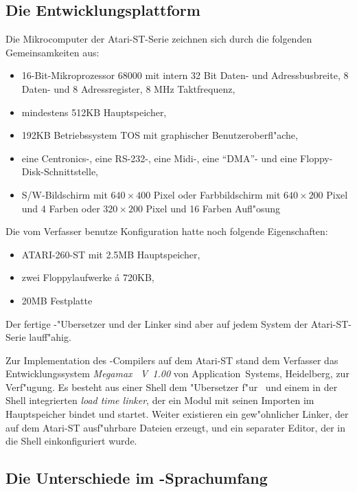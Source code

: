 \subsection{Die Entwicklungsplattform}

Die Mikrocomputer der Atari-ST-Serie zeichnen sich durch die folgenden
Gemeinsamkeiten aus:
\begin{itemize}
\item 16-Bit-Mikroprozessor 68000 mit intern 32 Bit Daten- und Adressbusbreite,
   8 Daten- und 8 Adressregister, 8 MHz Taktfrequenz,
\item mindestens 512KB Hauptspeicher,
\item 192KB Betriebssystem TOS mit graphischer Benutzeroberfl"ache,
\item eine Centronics-, eine RS-232-, eine Midi-, eine "`DMA"'- und
   eine Floppy-Disk-Schnittstelle,
\item S/W-Bildschirm mit $640\times400$ Pixel oder Farbbildschirm
   mit $640\times200$ Pixel und 4 Farben oder $320\times200$ Pixel
   und 16 Farben Aufl"osung
\end{itemize}

Die vom Verfasser benutze Konfiguration hatte noch folgende Eigenschaften:
\begin{itemize}
\item ATARI-260-ST mit 2.5MB Hauptspeicher,
\item zwei Floppylaufwerke \'a 720KB,
\item 20MB Festplatte
\end{itemize}

Der fertige \oberon-"Ubersetzer und der Linker sind aber auf jedem System
der Atari-ST-Serie lauff"ahig.

\medskip
Zur Implementation des \oberon-Compilers auf dem Atari-ST stand dem
Verfasser das Entwicklungssystem {\it Megamax \modula\ V~1.00\/}
von Application~Systems, Heidelberg, zur Verf"ugung.
Es besteht aus einer Shell
dem "Ubersetzer f"ur \modula\ und einem in der Shell integrierten
{\it load time linker}, der ein Modul mit seinen Importen im Hauptspeicher
bindet und startet.
Weiter existieren ein gew"ohnlicher Linker, der auf dem Atari-ST
ausf"uhrbare Dateien erzeugt, und ein separater Editor, der in die
Shell einkonfiguriert wurde.

\subsection{Die Unterschiede im \modula-Sprachumfang}

